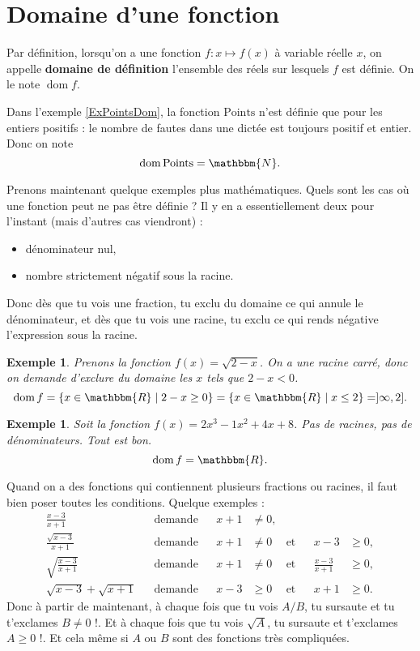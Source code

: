 \documentclass[a4paper,12pt]{book}
\newcommand{\eR}{\mathbbm{R}}
\newcommand{\eN}{\mathbbm{N}}
\DeclareMathOperator{\dom}{dom}
\theoremstyle{mes_exemples}	\newtheorem{exemple}[numtho]{Exemple}
\theoremstyle{mes_tho}
\newcommand{\defe}[2]{\textbf{#1}\index{#2}}
\newcommand{\tq}{\mid}
\begin{document}
%
   \section{Domaine d'une fonction}
%

Par définition, lorsqu'on a une fonction $f\colon x\mapsto f(x)$ à variable réelle $x$, on appelle \defe{domaine de définition}{Domaine de définition} l'ensemble des réels sur lesquels $f$ est définie. On le note $\dom f$.


Dans l'exemple \ref{ExPointsDom}, la fonction $\mathrm{Points}$ n'est définie que pour les entiers positifs : le nombre de fautes dans une dictée est toujours positif et entier. Donc on note
\[ 
  \dom\mathrm{Points}=\eN.
\]

Prenons maintenant quelque exemples plus mathématiques. Quels sont les cas où une fonction peut ne pas être définie ? Il y en a essentiellement deux pour l'instant (mais d'autres cas viendront) :
\begin{itemize}
\item dénominateur nul,
\item nombre strictement négatif sous la racine.
\end{itemize}
Donc dès que tu vois une fraction, tu exclu du domaine ce qui annule le dénominateur, et dès que tu vois une racine, tu exclu ce qui rends négative l'expression sous la racine.

\begin{exemple}
Prenons la fonction $f(x)=\sqrt{2-x}$. On a une racine carré, donc on demande d'exclure du domaine les $x$ tels que $2-x<0$.
\[ 
  \dom f=\{ x\in\eR\tq 2-x\geq 0 \}=\{ x\in\eR\tq x\leq 2 \}=]\infty,2].
\]
\end{exemple}

\begin{exemple}
Soit la fonction $f(x)=2x^3-1x^2+4x+8$. Pas de racines, pas de dénominateurs. Tout est bon.
\[ 
  \dom f=\eR.
\]
\end{exemple}

Quand on a des fonctions qui contiennent plusieurs fractions ou racines, il faut bien poser toutes les conditions. Quelque exemples :
\begin{align}
\frac{ x-3 }{ x+1 }			&&\text{demande}	&&x+1&\neq 0,\\
\frac{ \sqrt{x-3} }{ x+1 }		&&\text{demande}	&&x+1&\neq 0	&\text{et}	&&x-3&\geq 0,\\
\sqrt{\frac{ x-3 }{ x+1 }}		&&\text{demande}	&&x+1&\neq 0	&\text{et}	&&\frac{ x-3 }{ x+1 }&\geq 0,\\
\sqrt{x-3}+\sqrt{x+1}			&&\text{demande}	&&x-3&\geq 0	&\text{et}	&&x+1&\geq 0.
\end{align}
Donc à partir de maintenant, à chaque fois que tu vois $A/B$, tu sursaute et tu t'exclames \og $B\neq 0$ !\fg. Et à chaque fois que tu vois $\sqrt{A}$, tu sursaute et t'exclames \og $A\geq 0$ !\fg. Et cela même si $A$ ou $B$ sont des fonctions très compliquées.
\end{document}
